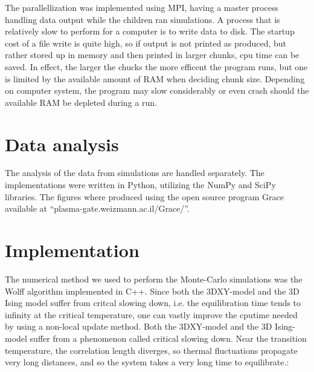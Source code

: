 The parallellization was implemented using MPI, having a master process handling data output while the children ran simulations.
A process that is relatively slow to perform for a computer is to write data to disk. 
The startup cost of a file write is quite high, so if output is not printed as produced, but rather stored up in memory and then printed in larger chunks, cpu time can be saved. 
In effect, the larger the chucks the more efficent the program runs, but one is limited by the available amount of RAM when deciding chunk size.
Depending on computer system, the program may slow considerably or even crash should the available RAM be depleted during a run.
\section{Data analysis}
The analysis of the data from simulations are handled separately.
The implementations were written in Python, utilizing the NumPy and SciPy libraries. 
The figures where produced using the open source program Grace available at ``plasma-gate.weizmann.ac.il/Grace/''.

\section{Implementation}
The numerical method we used to perform the Monte-Carlo simulations was the Wolff algorithm implemented in C++.
Since both the 3DXY-model and the 3D Ising model suffer from critcal slowing down, i.e. the equilibration time tends to infinity at the critical temperature, one can vastly improve the cputime needed by using a non-local update method.
Both the 3DXY-model and the 3D Ising-model suffer from a phenomenon called critical slowing down.
Near the transition temperature, the correlation length diverges, so thermal fluctuations propagate very long distances, and so the system takes a very long time to equilibrate.:

